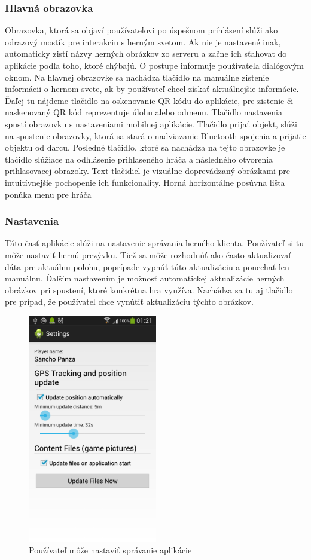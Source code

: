 \subsubsection{Hlavná obrazovka}
Obrazovka, ktorá sa objaví používateľovi po úspešnom prihlásení slúži ako odrazový mostík pre interakciu s herným svetom. Ak nie je nastavené inak, automaticky zistí názvy herných obrázkov zo serveru a začne ich sťahovat do aplikácie podľa toho, ktoré chýbajú. O postupe informuje používateľa dialógovým oknom. Na hlavnej obrazovke sa nachádza tlačidlo na manuálne zistenie informácii o hernom svete, ak by používateľ chcel získať aktuálnejšie informácie. Ďaľej tu nájdeme tlačidlo na oskenovanie QR kódu do aplikácie, pre zistenie či naskenovaný QR kód reprezentuje úlohu alebo odmenu. Tlačidlo nastavenia spustí obrazovku s nastaveniami mobilnej aplikácie. Tlačidlo prijať objekt, slúži na spustenie obrazovky, ktorá sa stará o nadviazanie Bluetooth spojenia a prijatie objektu od darcu. Posledné tlačidlo, ktoré sa nachádza na tejto obrazovke je tlačidlo slúžiace na odhlásenie prihlaseného hráča a následného otvorenia prihlasovacej obrazoky. Text tlačidiel je vizuálne doprevádzaný obrázkami pre intuitívnejšie pochopenie ich funkcionality. Horná horizontálne posúvna lišta ponúka menu pre hráča

\subsubsection{Nastavenia}
Táto časť aplikácie slúži na nastavenie správania herného klienta. Používateľ si tu môže nastaviť hernú prezývku. Tiež sa môže rozhodnúť ako často aktualizovať dáta pre aktuálnu polohu, poprípade vypnúť túto aktualizáciu a ponechať len manuálnu. Ďaľším nastavením je možnosť automatickej aktualizácie herných obrázkov pri spustení, ktoré konkrétna hra využíva. Nachádza sa tu aj tlačidlo pre prípad, že používatel chce vynútiť aktualizáciu týchto obrázkov.

\begin{figure}[h]
  \centering
  \includegraphics[height=10cm]{mainmatter/imgs/klient_settings.png}
  \caption{Používateľ môže nastaviť správanie aplikácie}
  \label{fig:klient_settings}
\end{figure}



